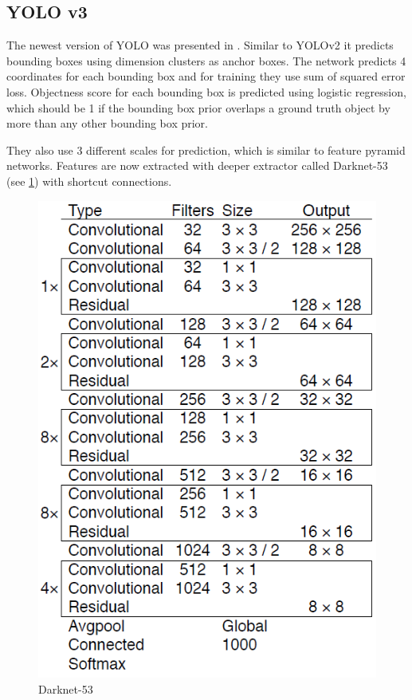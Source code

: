 \documentclass[twoside]{ctuthesis}
\theoremstyle{plain}
\theoremstyle{definition}
\theoremstyle{note}
\begin{document}
\subsection{YOLO v3}

The newest version of YOLO was presented in \cite{Redmon2018YOLOv3AI}. Similar to YOLOv2 it predicts bounding boxes using dimension clusters as anchor boxes. The network predicts 4 coordinates for each bounding box and for training they use sum of squared error loss. Objectness score for each bounding box is predicted using logistic regression, which should be 1 if the bounding box prior overlaps a ground truth object by more than any other bounding box prior. 

They also use 3 different scales for prediction, which is similar to feature pyramid networks. Features are now extracted with deeper  extractor called Darknet-53 (see \ref{darknet-53}) with shortcut connections.

\begin{figure}[h]
\caption{Darknet-53}
\label{darknet-53}
\includegraphics[width=\textwidth]{images/used_networks/yolov3_darknet.png}
\end{figure}
\end{document}

